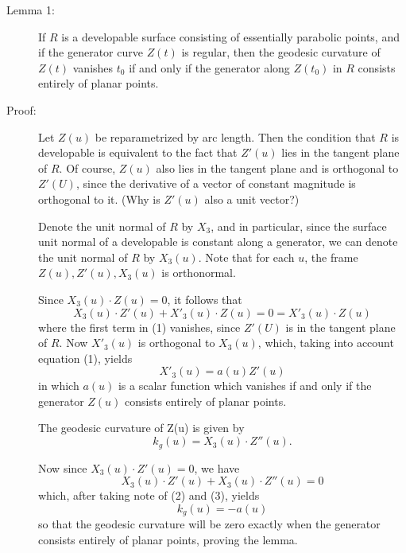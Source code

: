 \documentclass{book}
\begin{document}
\begin{description}
\item[Lemma 1:] If $R$ is a developable surface consisting of essentially parabolic points, and if the generator curve $Z(t)$ is regular, then the geodesic curvature of $Z(t)$ vanishes $t_{0}$ if and only if the generator along $Z(t_{0})$ in $R$ consists entirely of planar points.

\item[Proof:] Let $Z(u)$ be reparametrized by arc length. Then the condition that $R$ is developable is equivalent to the fact that $Z'(u)$ lies in the tangent plane of $R$. Of course, $Z(u)$ also lies in the tangent plane and is orthogonal to $Z'(U)$, since the derivative of a vector of constant magnitude is orthogonal to it. (Why is $Z'(u)$ also a unit vector?)

  Denote the unit normal of $R$ by $X_{3}$, and in particular, since the surface unit normal of a developable is constant along a generator, we can denote the unit normal of $R$ by $X_{3}(u)$. Note that for each $u$, the frame $Z(u), Z'(u), X_{3}(u)$ is orthonormal.

  Since $X_{3}(u) \cdot Z(u) = 0$, it follows that
  \begin{equation}
  X_{3}(u) \cdot Z'(u) + X'_{3}(u) \cdot Z(u) = 0 = X'_{3}(u) \cdot Z(u)
  \end{equation}
  where the first term in (1) vanishes, since $Z'(U)$ is in the tangent plane of $R$. Now $X'_{3}(u)$ is orthogonal to $X_{3}(u)$, which, taking into account equation (1), yields
  \begin{equation}
  X'_{3}(u) = a(u) Z'(u)
  \end{equation}
  in which $a(u)$ is a scalar function which vanishes if and only if the generator $Z(u)$ consists entirely of planar points.

  The geodesic curvature of Z(u) is given by
  \begin{equation}
  k_{g}(u) = X_{3}(u) \cdot Z''(u).
  \end{equation}

  Now since $X_{3}(u) \cdot Z'(u) = 0$, we have
  \begin{equation}
  X_{3}(u) \cdot Z'(u) + X_{3}(u) \cdot Z''(u) = 0
  \end{equation}
  which, after taking note of (2) and (3), yields
  \begin{equation}
  k_{g}(u) = -a(u)
  \end{equation}
  so that the geodesic curvature will be zero exactly when the generator consists entirely of planar points, proving the lemma.
\end{description}
\end{document}
